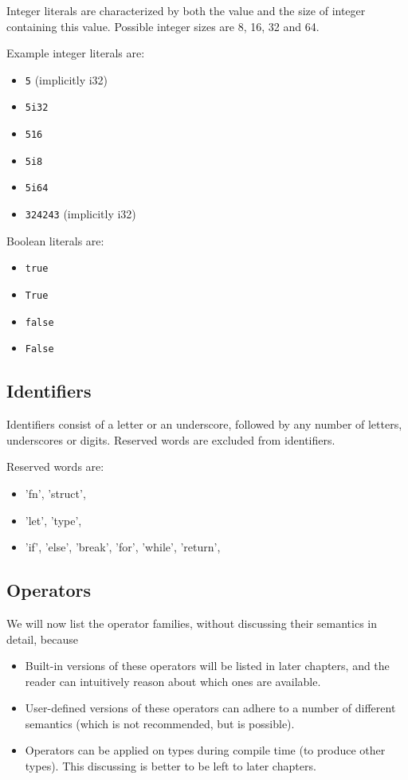 \documentclass[times, utf8, diplomski]{fer}
\theoremstyle{definition}
\begin{document}
Integer literals are characterized by both the value and the size of integer containing this value.
Possible integer sizes are 8, 16, 32 and 64.

Example integer literals are:
\begin{itemize}
    \item \texttt{5} (implicitly i32)
    \item \texttt{5i32}
    \item \texttt{516}
    \item \texttt{5i8}
    \item \texttt{5i64}
    \item \texttt{324243} (implicitly i32)
\end{itemize}

Boolean literals are:

\begin{itemize}
    \item \texttt{true}
    \item \texttt{True}
    \item \texttt{false}
    \item \texttt{False}
\end{itemize}

\subsection{Identifiers}

Identifiers consist of a letter or an underscore, followed by any number of letters, underscores or digits.
Reserved words are excluded from identifiers.

Reserved words are:
\begin{itemize}
    \item 'fn', 'struct',
    \item 'let', 'type',
    \item 'if', 'else', 'break', 'for', 'while', 'return',
\end{itemize}


\subsection{Operators}

We will now list the operator families, without discussing their semantics in detail, because

\begin{itemize}
    \item Built-in versions of these operators will be listed in later chapters, and the reader
        can intuitively reason about which ones are available.
    \item User-defined versions of these operators can adhere to a number of different semantics 
        (which is not recommended, but is possible).
    \item Operators can be applied on types during compile time (to produce other types). 
        This discussing is better to be left to later chapters.
\end{itemize}
\end{document}
